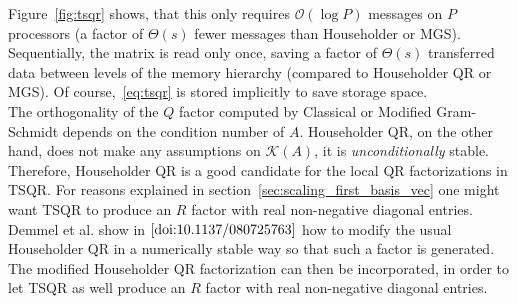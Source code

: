 \documentclass{scrartcl}
\begin{document}
Figure~\ref{fig:tsqr} shows, that this only requires $\mathcal{O}(\log P)$ messages on $P$ processors (a factor of $\Theta (s)$ fewer messages than Householder or MGS). Sequentially, the matrix is read only once, saving a factor of $\Theta(s)$ transferred data between levels of the memory hierarchy (compared to Householder QR or MGS). 
 Of course,~\eqref{eq:tsqr} is stored implicitly to save storage space.\\

The orthogonality of the $Q$ factor computed by Classical or Modified Gram-Schmidt depends on the condition number of $A$. Householder QR, on the other hand, does not make any assumptions on $\mathcal{K}(A)$, it is \textit{unconditionally} stable. Therefore, Householder QR is a good candidate for the local QR factorizations in TSQR. For reasons explained in section~\ref{sec:scaling_first_basis_vec} one might want TSQR to produce an $R$ factor with real non-negative diagonal entries. Demmel et al. show in $\cite{doi:10.1137/080725763}$ how to modify the usual Householder QR in a numerically stable way so that such a factor is generated. The modified Householder QR factorization can then be incorporated, in order to let TSQR as well produce an $R$ factor with real non-negative diagonal entries.
\end{document}
